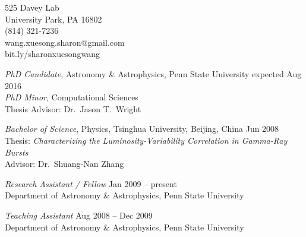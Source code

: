 

\begin{small}

\begin{center}
525 Davey Lab\\
University Park, PA 16802\\
(814) 321-7236\\
wang.xuesong.sharon@gmail.com\\
bit.ly/sharonxuesongwang\\


\end{center}
\smallskip




{\sl PhD Candidate}, Astronomy \& Astrophysics, Penn State University
\hfill expected Aug 2016 \\
{\sl PhD Minor}, Computational Sciences\\
Thesis Advisor: Dr.\ Jason T.\ Wright
\vspace{10pt}

{\sl Bachelor of Science}, Physics, Tsinghua University, Beijing,
China \hfill Jun 2008 \\
Thesis: \textit{Characterizing the Luminosity-Variability Correlation
  in Gamma-Ray Bursts}\\
Advisor: Dr.\ Shuang-Nan Zhang






{\sl Research Assistant / Fellow} \hfill        Jan 2009 -- present  \\
Department of Astronomy \& Astrophysics, Penn State University

\vspace{10pt}   
   
{\sl Teaching Assistant} \hfill       Aug 2008 -- Dec 2009 \\
Department of Astronomy \& Astrophysics, Penn State University
   





\end{small}
